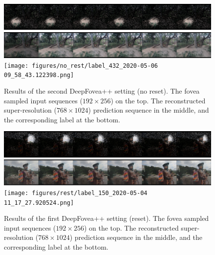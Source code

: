 \documentclass[10pt,twocolumn,letterpaper]{article}
\begin{document}
	\begin{figure}[htbp!]
		\centering
		\includegraphics[width=\columnwidth]{figures/no_rest/input_432_2020-05-06 09_58_44.696719.png}\\\vspace{-0.1cm}
		\includegraphics[width=\columnwidth]{figures/no_rest/prediction_432_2020-05-06 09_58_40.811600.png}\\\vspace{-0.1cm}
		\texttt{[image: figures/no\_rest/label\_432\_2020-05-06 09\_58\_43.122398.png]}\\
		\caption{Results of the second DeepFovea++ setting (no reset). The fovea sampled input sequences ($192 \times 256$) on the top. The reconstructed super-resolution ($768 \times 1024$) prediction sequence in the middle, and the corresponding label at the bottom.}
		\label{fig:norestresults2}
	\end{figure}
	
	\begin{figure}[htbp!]
		\centering
		\includegraphics[width=\columnwidth]{figures/rest/input_150_2020-05-04 11_17_29.891315.png}\\\vspace{-0.1cm}
		\includegraphics[width=\columnwidth]{figures/rest/prediction_150_2020-05-04 11_17_25.749898.png}\\\vspace{-0.1cm}
		\texttt{[image: figures/rest/label\_150\_2020-05-04 11\_17\_27.920524.png]}\\
		\caption{Results of the first DeepFovea++ setting (reset). The fovea sampled input sequences ($192 \times 256$) on the top. The reconstructed super-resolution ($768 \times 1024$) prediction sequence in the middle, and the corresponding label at the bottom.}
		\label{fig:restresults3}
	\end{figure}
	
\end{document}

